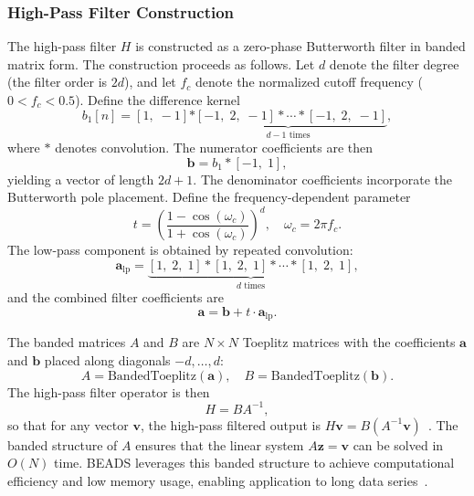\subsubsection{High-Pass Filter Construction}
\label{sec:bg_hpf}

The high-pass filter $H$ is constructed as a zero-phase Butterworth filter in banded matrix form. The construction proceeds as follows. Let $d$ denote the filter degree (the filter order is $2d$), and let $f_c$ denote the normalized cutoff frequency ($0 < f_c < 0.5$). Define the difference kernel
\begin{equation}
    b_1[n] = [1,\; -1] \underbrace{* [-1,\; 2,\; -1] * \cdots * [-1,\; 2,\; -1]}_{d-1 \text{ times}},
    \label{eq:b1_conv}
\end{equation}
where $*$ denotes convolution. The numerator coefficients are then
\begin{equation}
    \mathbf{b} = b_1 * [-1,\; 1],
    \label{eq:b_coeffs}
\end{equation}
yielding a vector of length $2d+1$. The denominator coefficients incorporate the Butterworth pole placement. Define the frequency-dependent parameter
\begin{equation}
    t = \left( \frac{1 - \cos(\omega_c)}{1 + \cos(\omega_c)} \right)^d, \quad \omega_c = 2\pi f_c.
    \label{eq:t_param}
\end{equation}
The low-pass component is obtained by repeated convolution:
\begin{equation}
    \mathbf{a}_{\text{lp}} = \underbrace{[1,\; 2,\; 1] * [1,\; 2,\; 1] * \cdots * [1,\; 2,\; 1]}_{d \text{ times}},
    \label{eq:a_lp}
\end{equation}
and the combined filter coefficients are
\begin{equation}
    \mathbf{a} = \mathbf{b} + t \cdot \mathbf{a}_{\text{lp}}.
    \label{eq:a_coeffs}
\end{equation}

The banded matrices $A$ and $B$ are $N \times N$ Toeplitz matrices with the coefficients $\mathbf{a}$ and $\mathbf{b}$ placed along diagonals $-d, \ldots, d$:
\begin{equation}
    A = \text{BandedToeplitz}(\mathbf{a}), \quad B = \text{BandedToeplitz}(\mathbf{b}).
    \label{eq:AB_matrices}
\end{equation}
The high-pass filter operator is then
\begin{equation}
    H = B A^{-1},
    \label{eq:H_operator}
\end{equation}
so that for any vector $\mathbf{v}$, the high-pass filtered output is $H\mathbf{v} = B(A^{-1}\mathbf{v})$~\cite{ning2014beads}. The banded structure of $A$ ensures that the linear system $A\mathbf{z} = \mathbf{v}$ can be solved in $O(N)$ time. BEADS leverages this banded structure to achieve computational efficiency and low memory usage, enabling application to long data series~\cite{ning2014beads}.

